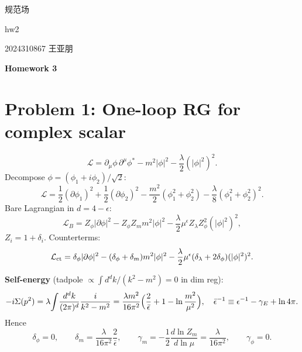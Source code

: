 \documentclass{article}
\begin{document}
\begin{flushright}
    规范场
    
    hw2

    2024310867 王亚朋
\end{flushright}
\begin{center}
    \Large{\textbf{Homework 3}}
\end{center}

\section*{Problem 1: One-loop RG for complex scalar}

\begin{equation}
\mathcal{L} = \partial_\mu\phi\,\partial^\mu\phi^* - m^2|\phi|^2 - \frac{\lambda}{2}(|\phi|^2)^2.
\end{equation}
Decompose $\phi = (\phi_1 + i\phi_2)/\sqrt{2}$:
\begin{equation}
\mathcal{L} = \frac12(\partial\phi_1)^2 + \frac12(\partial\phi_2)^2 - \frac{m^2}{2}(\phi_1^2+\phi_2^2) - \frac{\lambda}{8}(\phi_1^2+\phi_2^2)^2.
\end{equation}
Bare Lagrangian in $d=4-\epsilon$:
\begin{equation}
\mathcal{L}_B = Z_\phi|\partial\phi|^2 - Z_\phi Z_m m^2|\phi|^2 - \frac{\lambda}{2}\mu^\epsilon Z_\lambda Z_\phi^2(|\phi|^2)^2,
\end{equation}
$Z_i=1+\delta_i$. Counterterms:
\begin{equation}
\mathcal{L}_{\rm ct} = \delta_\phi|\partial\phi|^2 - (\delta_\phi+\delta_m)m^2|\phi|^2 - \frac{\lambda}{2}\mu^\epsilon(\delta_\lambda+2\delta_\phi)(|\phi|^2)^2.
\end{equation}

\medskip\noindent\textbf{Self-energy} (tadpole $\propto \int d^dk/(k^2-m^2)=0$ in dim reg):
\begin{equation}
-i\Sigma(p^2) = \lambda\!\int\!\frac{d^dk}{(2\pi)^d}\frac{i}{k^2-m^2} = \frac{\lambda m^2}{16\pi^2}\Bigl(\frac{2}{\bar\epsilon}+1-\ln\frac{m^2}{\mu^2}\Bigr),\quad \bar\epsilon^{-1}\equiv\epsilon^{-1}-\gamma_E+\ln4\pi.
\end{equation}
Hence
\begin{equation}
\delta_\phi = 0,\qquad \delta_m = \frac{\lambda}{16\pi^2}\frac{2}{\bar\epsilon},\qquad \gamma_m = -\frac12\frac{d\ln Z_m}{d\ln\mu} = \frac{\lambda}{16\pi^2},\qquad \gamma_\phi=0.
\end{equation}
\end{document}
